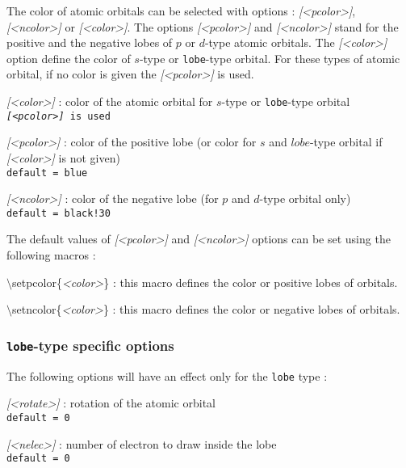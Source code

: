 \documentclass[10pt]{article}
\newcommand*{\cmd}[1]{{\ttfamily\color{blue!50!black}$\setminus$#1}\xspace}
\newcommand*{\opt}[1]{{\ttfamily\itshape\color{green!60!black}[<#1>]}\xspace}
\newcommand*{\marg}[1]{{\ttfamily\itshape\color{red!95!black}<#1>}\xspace}
\begin{document}
The color of atomic orbitals can be selected with options : \opt{pcolor}, \opt{ncolor} or \opt{color}. The options \opt{pcolor} and \opt{ncolor} stand for the positive and the negative lobes of $p$ or $d$-type atomic orbitals. The \opt{color} option define the color of $s$-type or \texttt{lobe}-type orbital. For these types of atomic orbital, if no color is given the \opt{pcolor} is used.

\begin{description}
    \item \opt{color} : color of the atomic orbital for $s$-type or \texttt{lobe}-type orbital \\
    \texttt{\opt{pcolor} is used}
    
    \item \opt{pcolor} : color of the positive lobe (or color for $s$ and $lobe$-type orbital if \opt{color} is not given)\\
    \texttt{default = blue}
    
    \item \opt{ncolor} : color of the negative lobe (for $p$ and $d$-type orbital only)\\
    \texttt{default = black!30}
\end{description}

The default values of \opt{pcolor} and \opt{ncolor} options can be set using the following macros :
\begin{description}
    \item \cmd{setpcolor}\{\marg{color}\} : this macro defines the color or positive lobes of orbitals.
    \item \cmd{setncolor}\{\marg{color}\} : this macro defines the color or negative lobes of orbitals.
\end{description}

\subsubsection*{\texttt{lobe}-type specific options}

The following options will have an effect only for the \texttt{lobe} type :

\begin{description}   
    \item \opt{rotate} : rotation of the atomic orbital\\
    \texttt{default = 0}
    
    \item \opt{nelec} : number of electron to draw inside the lobe\\
    \texttt{default = 0}
\end{description}
\end{document}
